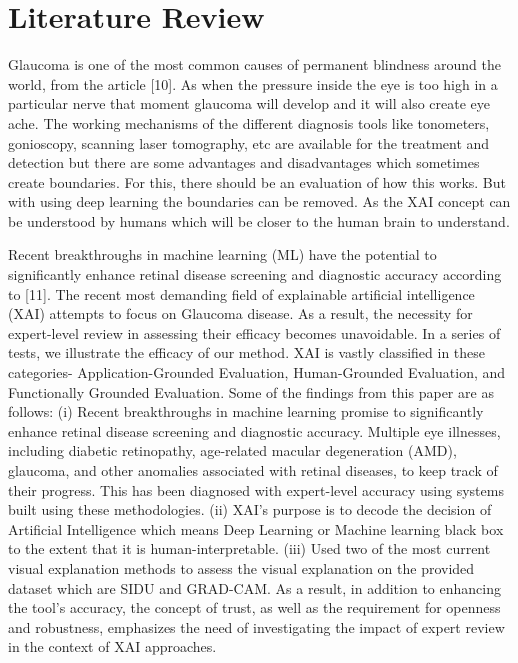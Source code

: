 \section{Literature Review} 
Glaucoma is one of the most common causes of permanent blindness around the world, from the article [10]. As when the pressure inside the eye is too high in a particular nerve that moment glaucoma will develop and it will also create eye ache. The working mechanisms of the different diagnosis tools like tonometers, gonioscopy, scanning laser tomography, etc are available for the treatment and detection but there are some advantages and disadvantages which sometimes create boundaries. For this, there should be an evaluation of how this works. But with using deep learning the boundaries can be removed. As the XAI concept can be understood by humans which will be closer to the human brain to understand.

\vspace{5mm}
\noindent Recent breakthroughs in machine learning (ML) have the potential to significantly enhance retinal disease screening and diagnostic accuracy according to [11]. The recent most demanding field of explainable artificial intelligence (XAI) attempts to focus on Glaucoma disease. As a result, the necessity for expert-level review in assessing their efficacy becomes unavoidable. In a series of tests, we illustrate the efficacy of our method. XAI is vastly classified in these categories- Application-Grounded Evaluation, Human-Grounded Evaluation, and Functionally Grounded Evaluation. Some of the findings from this paper are as follows: (i) Recent breakthroughs in machine learning promise to significantly enhance retinal disease screening and diagnostic accuracy. Multiple eye illnesses, including diabetic retinopathy, age-related macular degeneration (AMD), glaucoma, and other anomalies associated with retinal diseases, to keep track of their progress. This has been diagnosed with expert-level accuracy using systems built using these methodologies. (ii) XAI's purpose is to decode the decision of Artificial Intelligence which means Deep Learning or Machine learning black box to the extent that it is human-interpretable. (iii) Used two of the most current visual explanation methods to assess the visual explanation on the provided dataset which are SIDU and GRAD-CAM. As a result, in addition to enhancing the tool's accuracy, the concept of trust, as well as the requirement for openness and robustness, emphasizes the need of investigating the impact of expert review in the context of XAI approaches.

